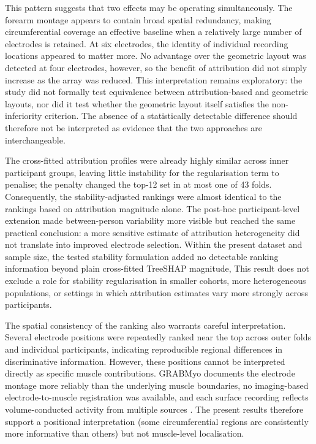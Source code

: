 This pattern suggests that two effects may be operating simultaneously. The forearm montage appears to contain broad spatial redundancy, making circumferential coverage an effective baseline when a relatively large number of electrodes is retained. At six electrodes, the identity of individual recording locations appeared to matter more. No advantage over the geometric layout was detected at four electrodes, however, so the benefit of attribution did not simply increase as the array was reduced. This interpretation remains exploratory: the study did not formally test equivalence between attribution-based and geometric layouts, nor did it test whether the geometric layout itself satisfies the non-inferiority criterion. The absence of a statistically detectable difference should therefore not be interpreted as evidence that the two approaches are interchangeable.

 The cross-fitted attribution profiles were already highly similar across inner participant groups, leaving little instability for the regularisation term to penalise; the penalty changed the top-12 set in at most one of 43 folds. Consequently, the stability-adjusted rankings were almost identical to the rankings based on attribution magnitude alone. The post-hoc participant-level extension made between-person variability more visible but reached the same practical conclusion: a more sensitive estimate of attribution heterogeneity did not translate into improved electrode selection. Within the present dataset and sample size, the tested stability formulation added no detectable ranking information beyond plain cross-fitted TreeSHAP magnitude,  This result does not exclude a role for stability regularisation \citep{xiang2026roshap} in smaller cohorts, more heterogeneous populations, or settings in which attribution estimates vary more strongly across participants.

The spatial consistency of the ranking also warrants careful interpretation. Several electrode positions were repeatedly ranked near the top across outer folds and individual participants, indicating reproducible regional differences in discriminative information. However, these positions cannot be interpreted directly as specific muscle contributions. GRABMyo documents the electrode montage more reliably than the underlying muscle boundaries, no imaging-based electrode-to-muscle registration was available, and each surface recording reflects volume-conducted activity from multiple sources \citep{farina2004extraction}. The present results therefore support a positional interpretation (some circumferential regions are consistently more informative than others) but not muscle-level localisation.

